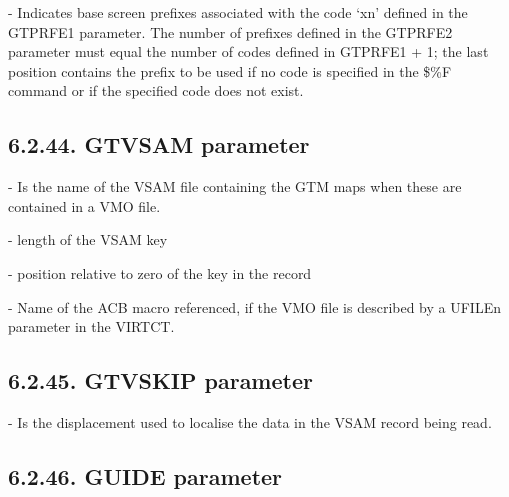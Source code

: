 \documentclass[letterpaper,10pt,english]{sphinxmanual}
\begin{document}
 - Indicates base screen prefixes associated with the code ‘xn’ defined in the GTPRFE1 parameter. The number of prefixes defined in the GTPRFE2 parameter must equal the number of codes defined in GTPRFE1 + 1; the last position contains the prefix to be used if no code is specified in the \$\%F command or if the specified code does not exist.


\subsection{6.2.44. GTVSAM parameter}
\label{\detokenize{Installation_Guide:gtvsam-parameter}}
\begin{sphinxVerbatim}[commandchars=\\\{\}]
       
\end{sphinxVerbatim}

 - Is the name of the VSAM file containing the GTM maps when these are contained in a VMO file.

 - length of the VSAM key

 - position relative to zero of the key in the record

 - Name of the ACB macro referenced, if the VMO file is described by a UFILEn parameter in the VIRTCT.


\subsection{6.2.45. GTVSKIP parameter}
\label{\detokenize{Installation_Guide:gtvskip-parameter}}
\begin{sphinxVerbatim}[commandchars=\\\{\}]
                
\end{sphinxVerbatim}

 - Is the displacement used to localise the data in the VSAM record being read.


\subsection{6.2.46. GUIDE parameter}
\label{\detokenize{Installation_Guide:guide-parameter}}
\begin{sphinxVerbatim}[commandchars=\\\{\}]
                  
\end{sphinxVerbatim}
\end{document}
